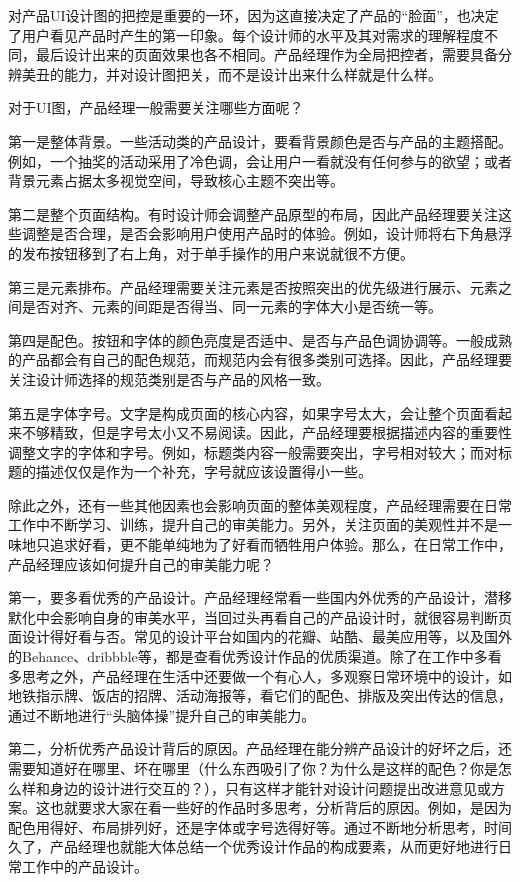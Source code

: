 \documentclass[letterpaper,10pt,english]{sphinxmanual}
\begin{document}
对产品UI设计图的把控是重要的一环，因为这直接决定了产品的“脸面”，也决定了用户看见产品时产生的第一印象。每个设计师的水平及其对需求的理解程度不同，最后设计出来的页面效果也各不相同。产品经理作为全局把控者，需要具备分辨美丑的能力，并对设计图把关，而不是设计出来什么样就是什么样。

对于UI图，产品经理一般需要关注哪些方面呢？

第一是整体背景。一些活动类的产品设计，要看背景颜色是否与产品的主题搭配。例如，一个抽奖的活动采用了冷色调，会让用户一看就没有任何参与的欲望；或者背景元素占据太多视觉空间，导致核心主题不突出等。

第二是整个页面结构。有时设计师会调整产品原型的布局，因此产品经理要关注这些调整是否合理，是否会影响用户使用产品时的体验。例如，设计师将右下角悬浮的发布按钮移到了右上角，对于单手操作的用户来说就很不方便。

第三是元素排布。产品经理需要关注元素是否按照突出的优先级进行展示、元素之间是否对齐、元素的间距是否得当、同一元素的字体大小是否统一等。

第四是配色。按钮和字体的颜色亮度是否适中、是否与产品色调协调等。一般成熟的产品都会有自己的配色规范，而规范内会有很多类别可选择。因此，产品经理要关注设计师选择的规范类别是否与产品的风格一致。

第五是字体字号。文字是构成页面的核心内容，如果字号太大，会让整个页面看起来不够精致，但是字号太小又不易阅读。因此，产品经理要根据描述内容的重要性调整文字的字体和字号。例如，标题类内容一般需要突出，字号相对较大；而对标题的描述仅仅是作为一个补充，字号就应该设置得小一些。

除此之外，还有一些其他因素也会影响页面的整体美观程度，产品经理需要在日常工作中不断学习、训练，提升自己的审美能力。另外，关注页面的美观性并不是一味地只追求好看，更不能单纯地为了好看而牺牲用户体验。那么，在日常工作中，产品经理应该如何提升自己的审美能力呢？

第一，要多看优秀的产品设计。产品经理经常看一些国内外优秀的产品设计，潜移默化中会影响自身的审美水平，当回过头再看自己的产品设计时，就很容易判断页面设计得好看与否。常见的设计平台如国内的花瓣、站酷、最美应用等，以及国外的Behance、dribbble等，都是查看优秀设计作品的优质渠道。除了在工作中多看多思考之外，产品经理在生活中还要做一个有心人，多观察日常环境中的设计，如地铁指示牌、饭店的招牌、活动海报等，看它们的配色、排版及突出传达的信息，通过不断地进行“头脑体操”提升自己的审美能力。

第二，分析优秀产品设计背后的原因。产品经理在能分辨产品设计的好坏之后，还需要知道好在哪里、坏在哪里（什么东西吸引了你？为什么是这样的配色？你是怎么样和身边的设计进行交互的？），只有这样才能针对设计问题提出改进意见或方案。这也就要求大家在看一些好的作品时多思考，分析背后的原因。例如，是因为配色用得好、布局排列好，还是字体或字号选得好等。通过不断地分析思考，时间久了，产品经理也就能大体总结一个优秀设计作品的构成要素，从而更好地进行日常工作中的产品设计。
\end{document}
